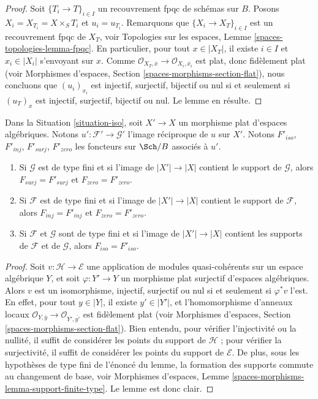 \begin{proof}
Soit $\{T_i \to T\}_{i \in I}$ un recouvrement fpqc de schémas sur $B$.
Posons $X_i = X_{T_i} = X \times_S T_i$ et $u_i = u_{T_i}$.
Remarquons que $\{X_i \to X_T\}_{i \in I}$ est un recouvrement fpqc de $X_T$, voir
Topologies sur les espaces, Lemme \ref{spaces-topologies-lemma-fpqc}.
En particulier, pour tout $x \in |X_T|$, il existe $i \in I$
et $x_i \in |X_i|$ s'envoyant sur $x$. Comme
$\mathcal{O}_{X_T, \overline{x}} \to \mathcal{O}_{X_i, \overline{x_i}}$
est plat, donc fidèlement plat (voir
Morphismes d'espaces, Section \ref{spaces-morphisms-section-flat}),
nous concluons que $(u_i)_{x_i}$ est injectif, surjectif, bijectif ou nul
si et seulement si $(u_T)_x$ est injectif, surjectif, bijectif ou nul.
Le lemme en résulte.
\end{proof}

\begin{lemma}
\label{lemma-iso-go-up}
Dans la Situation \ref{situation-iso}, soit $X' \to X$ un morphisme plat
d'espaces algébriques. Notons $u' : \mathcal{F}' \to \mathcal{G}'$
l'image réciproque de $u$ sur $X'$. Notons $F'_{iso}$, $F'_{inj}$, $F'_{surj}$,
$F'_{zero}$ les foncteurs sur $\Sch/B$ associés à $u'$.
\begin{enumerate}
\item Si $\mathcal{G}$ est de type fini et si l'image de $|X'| \to |X|$
contient le support de $\mathcal{G}$, alors $F_{surj} = F'_{surj}$
et $F_{zero} = F'_{zero}$.
\item Si $\mathcal{F}$ est de type fini et si l'image de $|X'| \to |X|$
contient le support de $\mathcal{F}$, alors $F_{inj} = F'_{inj}$
et $F_{zero} = F'_{zero}$.
\item Si $\mathcal{F}$ et $\mathcal{G}$ sont de type fini et si l'image de
$|X'| \to |X|$ contient les supports de $\mathcal{F}$ et de $\mathcal{G}$,
alors $F_{iso} = F'_{iso}$.
\end{enumerate}
\end{lemma}

\begin{proof}
Soit $v : \mathcal{H} \to \mathcal{E}$ une application de modules
quasi-cohérents sur un espace algébrique $Y$, et soit $\varphi : Y' \to Y$ un
morphisme plat surjectif d'espaces algébriques. Alors $v$ est
un isomorphisme, injectif, surjectif ou nul si et seulement si $\varphi^*v$ l'est.
En effet,
pour tout $y \in |Y|$, il existe $y' \in |Y'|$, et l'homomorphisme
d'anneaux locaux
$\mathcal{O}_{Y, \overline{y}} \to \mathcal{O}_{Y', \overline{y'}}$
est fidèlement plat (voir
Morphismes d'espaces, Section \ref{spaces-morphisms-section-flat}).
Bien entendu, pour vérifier l'injectivité ou la nullité, il suffit de considérer
les points du support de $\mathcal{H}$ ; pour vérifier la
surjectivité, il suffit de considérer les points du support de $\mathcal{E}$.
De plus, sous les hypothèses de type fini de l'énoncé du
lemme, la formation des supports commute au changement de base, voir
Morphismes d'espaces, Lemme \ref{spaces-morphisms-lemma-support-finite-type}.
Le lemme est donc clair.
\end{proof}

